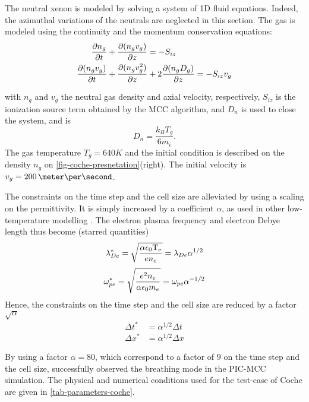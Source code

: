   The neutral xenon is modeled by solving a system of \ac{1D} fluid equations.
  Indeed, the azimuthal variations of the neutrals are neglected in this section.
  The gas is modeled using the continuity and the momentum conservation equations\string:
  \begin{align}
    \frac{\partial n_g}{\partial t} &+ \frac{\partial (n_g v_g)}{\partial z} = - S_{iz} \\
    \frac{\partial (n_g v_g)}{\partial t} &+ \frac{\partial (n_g v_g^2)}{\partial z} +  2 \frac{\partial ( n_g D_g)}{\partial z} = - S_{iz} v_g
  \end{align}

  with $n_g$ and $v_g$ the neutral gas density and axial velocity, respectively, $S_{iz}$ is the ionization source term obtained by the \ac{MCC} algorithm, and $D_n$ is used to close the system, and is \citep{coche2013}
  \begin{equation} \label{eq-Dn}
    D_n = \frac{k_B T_g}{6 m_i}.
  \end{equation}
  The gas temperature $T_g=640K$ and the initial condition is described on the density $n_g$ on \cref{fig-coche-presnetation}(right).
  The initial velocity is $v_g=200\,\meter\per\second$.


  The constraints on the time step and the cell size are alleviated by using a scaling on the permittivity.
  It is simply increased by a coefficient $\alpha$, as used in other low-temperature modelling \citep{fubiani2012,boeuf2012,liu2010}.
  The electron plasma frequency and electron Debye length thus become (starred quantities)
  \begin{equation} \label{eq-scaled_lde}
    \lambda_{De}^* = \sqrt{\frac{\alpha \epsilon_0 \mathrm{T_e}}{e n_e}} = \lambda_{De} \alpha^{1/2}
  \end{equation}
  \begin{equation} \label{eq-scaled_wpe}
    \omega_{pe}^* = \sqrt{\frac{e^2 n_e}{\alpha \epsilon_0 m_e}} = \omega_{pe} \alpha^{-1/2}
  \end{equation}
  Hence, the constraints on the time step and the cell size are reduced by a factor $\sqrt{\alpha}$
  \begin{align*}
    \Delta t ^* &= \alpha^{1/2} \Delta t \\
    \Delta x ^*&= \alpha^{1/2} \Delta x  
  \end{align*}

  By using a factor $\alpha=80$,  which correspond to a factor of $9$ on the time step and the cell size,  \citet{coche2014} successfully observed the breathing mode in the \ac{PIC}-\ac{MCC} simulation.
  The physical and numerical conditions used for the test-case of Coche are given in \cref{tab-parameters-coche}.

